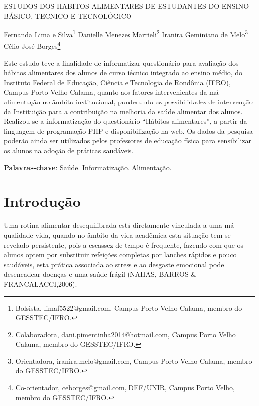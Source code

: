 \documentclass[article,12pt,onesidea,4paper,english,brazil]{abntex2}
\begin{document}
	
	
	\frenchspacing 
	
	\begin{center}
		\LARGE ESTUDOS DOS HABITOS ALIMENTARES DE ESTUDANTES DO ENSINO BÁSICO, TECNICO E TECNOLÓGICO
		
		\normalsize
		Fernanda Lima e Silva\footnote {Bolsista, limaf5522@gmail.com, Campus Porto Velho Calama, membro do GESSTEC/IFRO. } 
		Danielle Menezes Marrieli\footnote{Colaboradora, dani.pimentinha2014@hotmail.com, Campus Porto Velho Calama, membro do GESSTEC/IFRO.} 
		Iranira Geminiano de Melo\footnote{Orientadora, iranira.melo@gmail.com, Campus Porto Velho Calama, membro do GESSTEC/IFRO. } 
		Célio José Borges\footnote {Co-orientador, ceborges@gmail.com, DEF/UNIR, Campus Porto Velho, membro do GESSTEC/IFRO.} 
	\end{center}
	
	\begin{resumoumacoluna}
		Este estudo teve a finalidade de informatizar questionário para avaliação dos hábitos alimentares dos alunos de curso técnico integrado ao ensino médio, do Instituto Federal de Educação, Ciência e Tecnologia de Rondônia (IFRO), Campus Porto Velho Calama, quanto aos fatores intervenientes da má alimentação no âmbito institucional, ponderando as possibilidades de intervenção da Instituição para a contribuição na melhoria da saúde alimentar dos alunos. Realizou-se a informatização do questionário “Hábitos alimentares”, a partir da linguagem de programação PHP e disponibilização na web. Os dados da pesquisa poderão ainda ser utilizados pelos professores de educação física para sensibilizar os alunos na adoção de práticas saudáveis.
		
		
		\vspace{\onelineskip}
		
		\noindent
		\textbf{Palavras-chave}: Saúde. Informatização. Alimentação.
	\end{resumoumacoluna}
	
	\section*{Introdução}
	
Uma rotina alimentar desequilibrada está diretamente vinculada a uma má qualidade vida, quando no âmbito da vida acadêmica esta situação tem se revelado persistente, pois a escassez de tempo é frequente, fazendo com que os alunos optem por substituir refeições completas por lanches rápidos e pouco saudáveis, esta prática associada ao stress e ao desgaste emocional pode desencadear doenças e uma saúde frágil (NAHAS, BARROS \& FRANCALACCI,2006).
\end{document}
